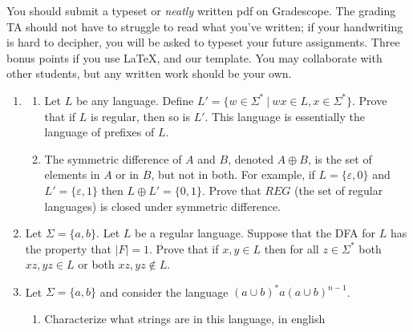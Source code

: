 \documentclass[11pt]{article}
\begin{document}

You should submit a typeset or \emph{neatly} written pdf on Gradescope.  The grading TA should not have to struggle to read what you've written; if your handwriting is hard to decipher, you will be asked to typeset your future assignments. Three bonus points if you use \LaTeX, and our template. You may collaborate with other students, but any written work should be your own. 

\begin{enumerate}
    \item 
    \begin{enumerate}
        \item  Let $L$ be any language. Define $L' = \{w \in \Sigma^* ~|~ wx \in L, x \in \Sigma^*\}$. Prove that if $L$ is regular, then so is $L'$. This language is essentially the language of prefixes of $L$.

        \begin{answer}
            
        \end{answer}
        
        \item The symmetric difference of $A$ and $B$, denoted $A \oplus B$, is the set of elements in $A$ or in $B$, but not in both. For example, if $L=\{\varepsilon, 0\}$ and $L'=\{\varepsilon, 1\}$ then $L\oplus L' = \{0,1\}$. Prove that $REG$ (the set of regular languages) is closed under symmetric difference.
        
        \begin{answer}
            
        \end{answer}
    \end{enumerate}


    \item Let $\Sigma = \{a,b\}$. Let $L$ be a regular language. Suppose that the DFA for $L$ has the property that $|F| = 1$. Prove that if $x,y \in L$ then for all $z \in \Sigma^*$ both $xz,yz \in L$ or both $xz,yz \not \in L$. 

    \begin{answer}
        
    \end{answer}

    \item Let $\Sigma = \{a,b\}$ and consider the language $(a \cup b)^*a(a\cup b)^{n-1}$. 
    \begin{enumerate}
        \item Characterize what strings are in this language, in english


\end{enumerate}
\end{enumerate}
\end{document}
